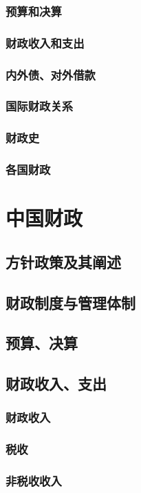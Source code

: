 \documentclass[UTF8]{../../RepresentationUniverse}
\begin{document}
    \subsubsection{预算和决算}
    \subsubsection{财政收入和支出}
    \subsubsection{内外债、对外借款}
    \subsubsection{国际财政关系}
    \subsubsection{财政史}
    \subsubsection{各国财政}

\section{中国财政}
    \subsection{方针政策及其阐述}
    \subsection{财政制度与管理体制}
    \subsection{预算、决算}
    \subsection{财政收入、支出}
        \subsubsection{财政收入}
        \subsubsection{税收}
        \subsubsection{非税收收入}
\end{document}
